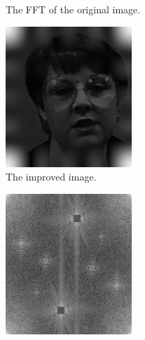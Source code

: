 \begin{figure}
\begin{subfigure}{.4\textwidth}
    \caption{The FFT of the original image.}
    \label{fig:blurry_fft}
\end{subfigure}
\begin{subfigure}{.4\textwidth}
    \centering
    \includegraphics[width=\linewidth]{figures/improved_face.png}
    \caption{The improved image.}
    \label{fig:covered_fft}
\end{subfigure}
\begin{subfigure}{.4\textwidth}
    \centering
    \includegraphics[width=\linewidth]{figures/covered_fft.png}

\end{subfigure}
\end{figure}
